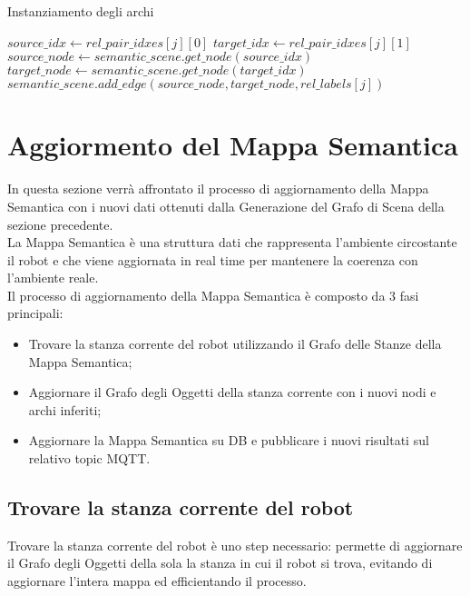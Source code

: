 \begin{algorithm}
  \caption{Instanziamento degli archi}
  \begin{algorithmic}[1]
    \State $source\_idx \gets rel\_pair\_idxes[j][0]$
    \State $target\_idx \gets rel\_pair\_idxes[j][1]$
    \State $source\_node \gets semantic\_scene.get\_node(source\_idx)$
    \State $target\_node \gets semantic\_scene.get\_node(target\_idx)$
    \State $semantic\_scene.add\_edge(source\_node, target\_node, rel\_labels[j])$
    \EndIf
    \EndIf
    \EndFor
  \end{algorithmic}
\end{algorithm}

\section{Aggiormento del Mappa Semantica}
In questa sezione verrà affrontato il processo di aggiornamento della Mappa Semantica con i nuovi dati ottenuti dalla Generazione del Grafo di Scena della sezione precedente.\\
La Mappa Semantica è una struttura dati che rappresenta l'ambiente circostante il robot e che viene aggiornata in real time per mantenere la coerenza con l'ambiente reale.\\
Il processo di aggiornamento della Mappa Semantica è composto da 3 fasi principali:
\begin{itemize}
  \item Trovare la stanza corrente del robot utilizzando il Grafo delle Stanze della Mappa Semantica;
  \item Aggiornare il Grafo degli Oggetti della stanza corrente con i nuovi nodi e archi inferiti;
  \item Aggiornare la Mappa Semantica su DB e pubblicare i nuovi risultati sul relativo topic MQTT.
\end{itemize}

\subsection{Trovare la stanza corrente del robot}
Trovare la stanza corrente del robot è uno step necessario: permette di aggiornare il Grafo degli Oggetti della sola la stanza in cui il robot si trova, evitando di aggiornare l'intera mappa ed efficientando il processo.
